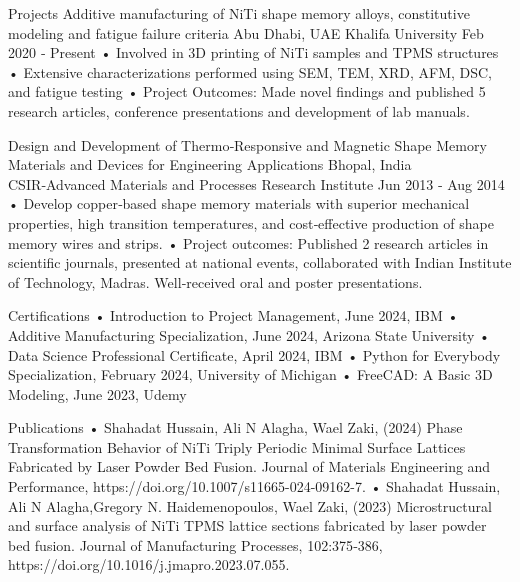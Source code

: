 \documentclass[a4paper]{article}
\begin{document}
Projects
Additive manufacturing of NiTi shape memory alloys, constitutive
modeling and fatigue failure criteria Abu Dhabi, UAE
Khalifa University Feb 2020 ‑ Present
• Involved in 3D printing of NiTi samples and TPMS structures
• Extensive characterizations performed using SEM, TEM, XRD, AFM, DSC, and fatigue testing
• Project Outcomes: Made novel findings and published 5 research articles, conference presentations and development
of lab manuals.

Design and Development of Thermo‑Responsive and Magnetic Shape
Memory Materials and Devices for Engineering Applications Bhopal, India
CSIR‑Advanced Materials and Processes Research Institute Jun 2013 ‑ Aug 2014
• Develop copper‑based shape memory materials with superior mechanical properties, high transition temperatures,
and cost‑effective production of shape memory wires and strips.
• Project outcomes: Published 2 research articles in scientific journals, presented at national events, collaborated
with Indian Institute of Technology, Madras. Well‑received oral and poster presentations.

Certifications
• Introduction to Project Management, June 2024, IBM
• Additive Manufacturing Specialization, June 2024, Arizona State University
• Data Science Professional Certificate, April 2024, IBM
• Python for Everybody Specialization, February 2024, University of Michigan
• FreeCAD: A Basic 3D Modeling, June 2023, Udemy

Publications
• Shahadat Hussain, Ali N Alagha, Wael Zaki, (2024) Phase Transformation Behavior of NiTi Triply Periodic Minimal
Surface Lattices Fabricated by Laser Powder Bed Fusion. Journal of Materials Engineering and Performance,
https://doi.org/10.1007/s11665-024-09162-7.
• Shahadat Hussain, Ali N Alagha,Gregory N. Haidemenopoulos, Wael Zaki, (2023) Microstructural and surface
analysis of NiTi TPMS lattice sections fabricated by laser powder bed fusion. Journal of Manufacturing Processes,
102:375‑386, https://doi.org/10.1016/j.jmapro.2023.07.055.
\end{document}
